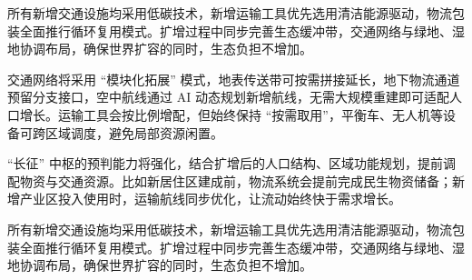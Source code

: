 所有新增交通设施均采用低碳技术，新增运输工具优先选用清洁能源驱动，物流包装全面推行循环复用模式。扩增过程中同步完善生态缓冲带，交通网络与绿地、湿地协调布局，确保世界扩容的同时，生态负担不增加。

交通网络将采用 ``模块化拓展'' 模式，地表传送带可按需拼接延长，地下物流通道预留分支接口，空中航线通过 AI 动态规划新增航线，无需大规模重建即可适配人口增长。运输工具会按比例增配，但始终保持 ``按需取用''，平衡车、无人机等设备可跨区域调度，避免局部资源闲置。

``长征'' 中枢的预判能力将强化，结合扩增后的人口结构、区域功能规划，提前调配物资与交通资源。比如新居住区建成前，物流系统会提前完成民生物资储备；新增产业区投入使用时，运输航线同步优化，让流动始终快于需求增长。

所有新增交通设施均采用低碳技术，新增运输工具优先选用清洁能源驱动，物流包装全面推行循环复用模式。扩增过程中同步完善生态缓冲带，交通网络与绿地、湿地协调布局，确保世界扩容的同时，生态负担不增加。

